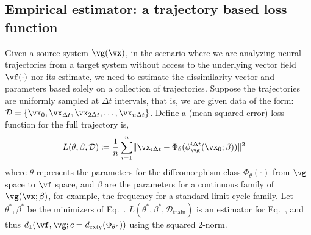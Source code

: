 \documentclass{article}
\theoremstyle{definition} \newtheorem{definition}{Definition}  \newtheorem{example}{Example}
\theoremstyle{remark} \newtheorem{remark}{Remark}
\renewcommand{\eqref}{Eq.~\originaleqref}
\newcounter{ct}
\DeclarePairedDelimiter{\norm}{\lVert}{\rVert}
\newcommand{\field}[1]{\ensuremath{\mathbb{#1}}}
\newcommand{\reals}{\field{R}}
\newcommand{\dcomplexity}{\ensuremath{d_\text{cxty}}}
\newcommand{\homeo}{\Phi} %
\begin{document}
\subsection{Empirical estimator: a trajectory based loss function}\label{sec:loss}
Given a source system $\vg(\vx)$, in the scenario where we are analyzing neural trajectories from a target system without access to the underlying vector field $\vf(\cdot)$ nor its estimate, we need to estimate the dissimilarity vector and parameters based solely on a collection of trajectories.
Suppose the trajectories are uniformly sampled at $\Delta t$ intervals, that is, we are given data of the form:
$\mathcal{D} = \{ \vx_0, \vx_{\Delta t}, \vx_{2\Delta t}, \ldots, \vx_{n \Delta t}\}$.
Define a (mean squared error) loss function for the full trajectory is,
\begin{align}\label{eq:loss}
    L(\theta, \beta, \mathcal{D}) &\coloneq \frac{1}{n} \sum_{i=1}^n
	\norm{\vx_{i\Delta t} - \homeo_\theta(\phi_\vg^{i\Delta t}(\vx_0; \beta))}^2
\end{align}
where $\theta$ represents the parameters for the diffeomorphism class $\homeo_\theta(\cdot)$ from $\vg$ space to $\vf$ space,
and $\beta$ are the parameters for a continuous family of $\vg(\vx; \beta)$, for example, the frequency for a standard limit cycle family.
Let $\theta^\ast, \beta^\ast$ be the minimizers of \eqref{eq:loss}.
$L(\theta^\ast, \beta^\ast, \mathcal{D}_{\text{train}})$ is 
an estimator for \eqref{eq:ed1}, and thus $\bar{d}_1(\vf, \vg; c = \dcomplexity(\homeo_{\theta^\ast}))$ using the squared 2-norm.



\end{document}
